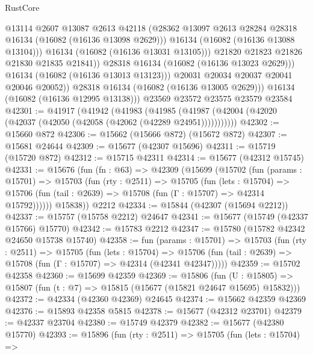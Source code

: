 \begin{lexlean}{RustCore}
\begin{coremodule}
                        @13114
                        @2607
                        @13087
                        @2613
                        @42118
                        (@28362 @13097 @2613 @28284 @28318 @16134 (@16082 (@16136 @13098 @2629)))
                        @16134
                        (@16082 (@16136 @13088 @13104)))
                      @16134
                      (@16082 (@16136 @13031 @13105)))
                    @21820
                    @21823
                    @21826
                    @21830
                    @21835
                    @21841))
                @28318
                @16134
                (@16082 (@16136 @13023 @2629)))
              @16134
              (@16082 (@16136 @13013 @13123)))
            @20031
            @20034
            @20037
            @20041
            @20046
            @20052))
        @28318
        @16134
        (@16082 (@16136 @13005 @2629)))
      @16134
      (@16082 (@16136 @12995 @13138)))
    @23569
    @23572
    @23575
    @23579
    @23584
@42301 := @41917
    (@41942
      (@41983
        (@41985 (@41987 (@42004 (@42020 (@42037 (@42050 (@42058 (@42062 (@42289 @24951)))))))))))
@42302 := @15660 @872
@42306 := @15662 (@15666 @872) (@15672 @872)
@42307 := @15681 @24644
@42309 := @15677 (@42307 @15696)
@42311 := @15719 (@15720 @872)
@42312 := @15715 @42311
@42314 := @15677 (@42312 @15745)
@42331 := @15676
    (fun (fn : @63) =>
    @42309
      (@15699
        (@15702
          (fun (params : @15701) =>
          @15703
            (fun (rty : @2511) =>
            @15705
              (fun (lets : @15704) =>
              @15706 (fun (tail : @2639) => @15708 (fun (Γ : @15707) => @42314 @15792))))))
        @15838))
    @2212
@42334 := @15844 (@42307 (@15694 @2212))
@42337 := @15757 (@15758 @2212) @24647
@42341 := @15677 (@15749 (@42337 @15766) @15770)
@42342 := @15783 @2212
@42347 := @15780 (@15782 @42342 @24650 @15738 @15740)
@42358 := fun (params : @15701) =>
  @15703
    (fun (rty : @2511) =>
    @15705
      (fun (lets : @15704) =>
      @15706 (fun (tail : @2639) => @15708 (fun (Γ : @15707) => @42314 (@42341 @42347)))))
@42359 := @15702 @42358
@42360 := @15699 @42359
@42369 := @15806
    (fun (U : @15805) => @15807 (fun (t : @7) => @15815 (@15677 (@15821 @24647 @15695) @15832)))
@42372 := @42334 (@42360 @42369) @24645
@42374 := @15662 @42359 @42369
@42376 := @15893 @42358 @5815
@42378 := @15677 (@42312 @23701)
@42379 := @42337 @23704
@42380 := @15749 @42379
@42382 := @15677 (@42380 @15770)
@42393 := @15896
    (fun (rty : @2511) =>
    @15705
      (fun (lets : @15704) =>

\end{coremodule}
\end{lexlean}
